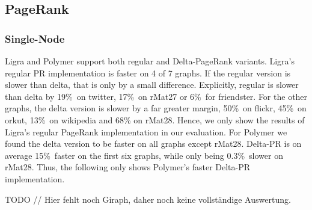 

\subsection{PageRank}
\subsubsection{Single-Node}

Ligra and Polymer support both regular and Delta-PageRank variants.
Ligra's regular PR implementation is faster on 4 of 7 graphs. If the regular version is slower than delta, that is only by a small difference. Explicitly, regular is slower than delta by 19\%\ on twitter, 17\%\ on rMat27 or 6\%\ for friendster. For the other graphs, the delta version is slower by a far greater margin, 50\%\ on flickr, 45\%\ on orkut, 13\%\ on wikipedia and 68\% on rMat28.
Hence, we only show the results of Ligra's regular PageRank implementation in our evaluation.
For Polymer we found the delta version to be faster on all graphs except rMat28. Delta-PR is on average 15\%\ faster on the first six graphs, while only being 0.3\%\ slower on rMat28.
Thus, the following only shows Polymer's faster Delta-PR implementation.


TODO // Hier fehlt noch Giraph, daher noch keine vollständige Auswertung.

